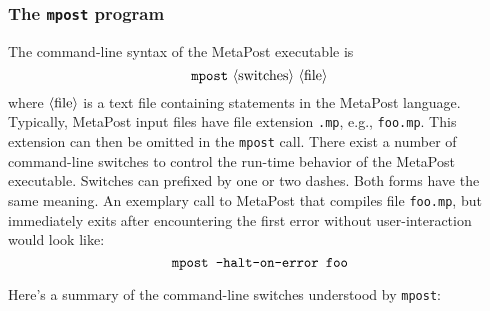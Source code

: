 \begingroup
\renewcommand*{\arraystretch}{1.25}%
\newcommand*{\cmdindex}[1]{\index{command-line!\texttt{#1}}\texttt{#1}}

\subsubsection*{The \texttt{mpost} program}
\label{refman:mpost}

The command-line syntax of the MetaPost executable is
$$ {\tt mpost}\ \descr{switches}\ \descr{file}
$$\label{Dmpost}
where ${\langle\hbox{file}\rangle}$ is a text file containing statements in the
MetaPost language.  Typically, MetaPost input files have file extension
\texttt{.mp}, e.g., \texttt{foo.mp}.  This extension can then be omitted
in the \texttt{mpost} call.  There exist a number of command-line
switches to control the run-time behavior of the MetaPost executable.
Switches can prefixed by one or two dashes.  Both forms have the same
meaning.  An exemplary call to MetaPost that compiles file
\texttt{foo.mp}, but immediately exits after encountering the first
error without user-interaction would look like:
$$ \hbox{\tt mpost -halt-on-error foo} $$

Here's a summary of the command-line switches understood by
\texttt{mpost}:

